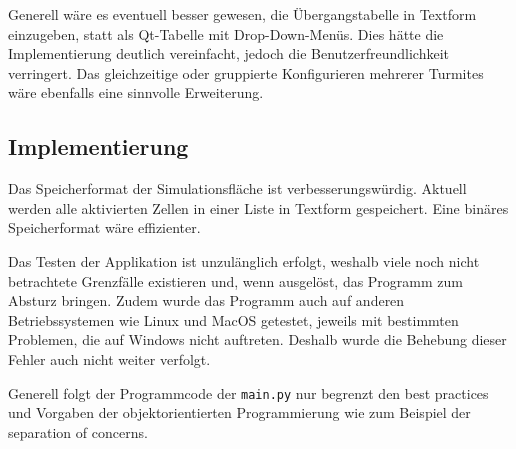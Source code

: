Generell wäre es eventuell besser gewesen, die Übergangstabelle in Textform einzugeben, statt als Qt-Tabelle mit Drop-Down-Menüs. Dies hätte die Implementierung deutlich vereinfacht, jedoch die Benutzerfreundlichkeit verringert. Das gleichzeitige oder gruppierte Konfigurieren mehrerer Turmites wäre ebenfalls eine sinnvolle Erweiterung.

\subsection{Implementierung}
Das Speicherformat der Simulationsfläche ist verbesserungswürdig. Aktuell werden alle aktivierten Zellen in einer Liste in Textform gespeichert. Eine binäres Speicherformat wäre effizienter.  

Das Testen der Applikation ist unzulänglich erfolgt, weshalb viele noch nicht betrachtete Grenzfälle existieren und, wenn ausgelöst, das Programm zum Absturz bringen. Zudem wurde das Programm auch auf anderen Betriebssystemen wie Linux und MacOS getestet, jeweils mit bestimmten Problemen, die auf Windows nicht auftreten. Deshalb wurde die Behebung dieser Fehler auch nicht weiter verfolgt.

Generell folgt der Programmcode der \texttt{main.py} nur begrenzt den best practices und Vorgaben der objektorientierten Programmierung wie zum Beispiel der separation of concerns. 